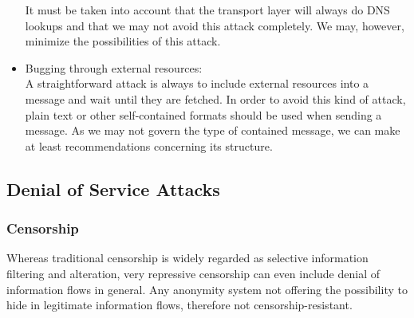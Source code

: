 \begin{itemize}
	It must be taken into account that the transport layer will always do DNS lookups and that we may not avoid this attack completely. We may, however, minimize the possibilities of this attack.
	
	\item Bugging through external resources:\\
	A straightforward attack is always to include external resources into a message and wait until they are fetched. In order to avoid this kind of attack, plain text or other self-contained formats should be used when sending a message. As we may not govern the type of contained message, we can make at least recommendations concerning its structure.
\end{itemize}

\subsection{Denial of Service Attacks}
\subsubsection{Censorship}
Whereas traditional censorship is widely regarded as selective information filtering and alteration, very repressive censorship can even include denial of information flows in general. Any anonymity system not offering the possibility to hide in legitimate information flows, therefore not censorship-resistant.

